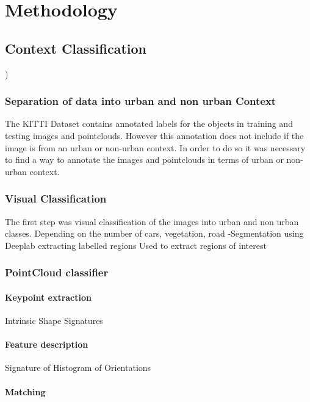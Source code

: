 \let\textcircled=\pgftextcircled
\chapter{Methodology}
\label{chap:body}



\section{ Context Classification})
\subsection{Separation of data into urban and non urban Context}

The KITTI Dataset contains annotated labels for the objects in training and testing images and pointclouds. However this annotation does not include if the image is from an urban or non-urban context. 
In order to do so it was necessary to find a way to annotate the images and pointclouds in terms of urban or non-urban context. 

\subsection{Visual Classification}
 The first step was visual classification of the images into urban and non urban classes. 
 Depending on the  number of cars, vegetation, road 
-Segmentation using Deeplab 
extracting labelled regions 
Used to extract regions of interest 


\subsection{PointCloud classifier}


\subsubsection{Keypoint extraction }
Intrinsic Shape Signatures 

\subsubsection{Feature description}
Signature of Histogram of Orientations


\subsubsection{Matching}





